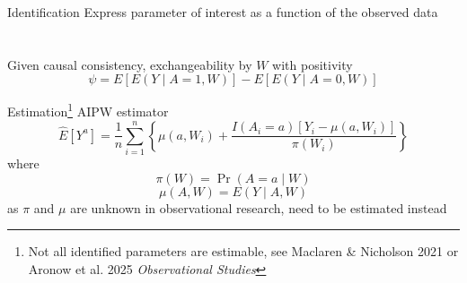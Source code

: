 \documentclass{beamer}
\begin{document}
\begin{frame}{Identification}
	Express parameter of interest as a function of the observed data
	~\\~\\~\\
	Given causal consistency, exchangeability by $W$ with positivity
	\[ \psi = E\left[ E(Y \mid A=1, W) \right] - E\left[ E(Y \mid A=0, W) \right] \]
\end{frame}

\begin{frame}{Estimation\footnote[frame]{Not all identified parameters are estimable, see Maclaren \& Nicholson 2021 or Aronow et al. 2025 \textit{Observational Studies}}}
	AIPW estimator
	\begin{equation*}
		\hat{E}[Y^a] = \frac{1}{n} \sum_{i=1}^{n} \left\{ \mu(a, W_i) + \frac{I(A_i = a) \left[ Y_i - \mu(a, W_i)\right]}{\pi(W_i)} \right\}
	\end{equation*}
	where
	\[\pi(W) = \Pr(A=a \mid W)\]
	\[\mu(A, W) = E(Y \mid A, W)\]
	as $\pi$ and $\mu$ are unknown in observational research, need to be estimated instead
\end{frame}

%
\end{document}
